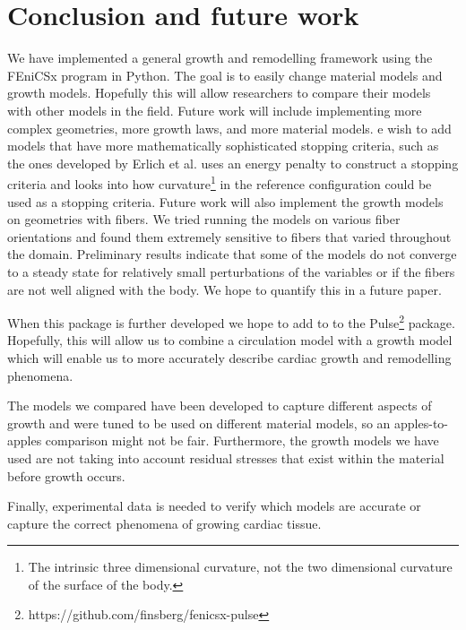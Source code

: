 \section{Conclusion and future work}
We have implemented a general growth and remodelling framework using the FEniCSx program in Python. The goal is to easily change material models and growth models. Hopefully this will allow researchers to compare their models with other models in the field. Future work will include implementing more complex geometries, more growth laws, and more material models.  e wish to add models that have more mathematically sophisticated stopping criteria, such as the ones developed by Erlich et al. \citep{Erlich2023} uses an energy penalty to construct a stopping criteria and \citep{Erlich2024} looks into how curvature\footnote{The intrinsic three dimensional curvature, not the two dimensional curvature of the surface of the body.} in the reference configuration could be used as a stopping criteria. Future work will also implement the growth models on geometries with fibers. We tried running the models on various fiber orientations and found them extremely sensitive to fibers that varied throughout the domain. Preliminary results indicate that some of the models do not converge to a steady state for relatively small perturbations of the variables or if the fibers are not well aligned with the body. We hope to quantify this in a future paper. \par
When this package is further developed we hope to add to to the Pulse\footnote{https://github.com/finsberg/fenicsx-pulse} package. Hopefully, this will allow us to combine a circulation model with a growth model which will enable us to more accurately describe cardiac growth and remodelling phenomena. \par
The models we compared have been developed to capture different aspects of growth and were tuned to be used on different material models, so an apples-to-apples comparison might not be fair. Furthermore, the growth models we have used are not taking into account residual stresses that exist within the material before growth occurs. \par
Finally, experimental data is needed to verify which models are accurate or capture the correct phenomena of growing cardiac tissue.


% 

